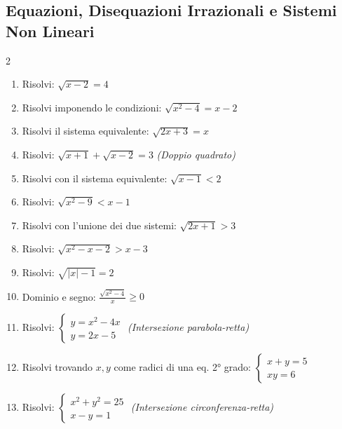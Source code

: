 \subsection{Equazioni, Disequazioni Irrazionali e Sistemi Non Lineari}
\begin{multicols}{2}
\begin{enumerate}
    \item {} Risolvi: $\sqrt{x-2} = 4$
    \item {} Risolvi imponendo le condizioni: $\sqrt{x^2 - 4} = x - 2$
    \item {} Risolvi il sistema equivalente: $\sqrt{2x+3} = x$
    \item {} Risolvi: $\sqrt{x+1} + \sqrt{x-2} = 3$ \textit{(Doppio quadrato)}
    \item {} Risolvi con il sistema equivalente: $\sqrt{x-1} < 2$
    \item {} Risolvi: $\sqrt{x^2 - 9} < x - 1$
    \item {} Risolvi con l'unione dei due sistemi: $\sqrt{2x+1} > 3$
    \item {} Risolvi: $\sqrt{x^2 - x - 2} > x - 3$
    \item {} Risolvi: $\sqrt{|x| - 1} = 2$
    \item {} Dominio e segno: $\frac{\sqrt{x^2-4}}{x} \ge 0$
    \item {} Risolvi: $\begin{cases} y = x^2 - 4x \\ y = 2x - 5 \end{cases}$ \textit{(Intersezione parabola-retta)}
    \item {} Risolvi trovando $x,y$ come radici di una eq. 2° grado: $\begin{cases} x+y=5 \\ xy=6 \end{cases}$
    \item {} Risolvi: $\begin{cases} x^2 + y^2 = 25 \\ x - y = 1 \end{cases}$ \textit{(Intersezione circonferenza-retta)}
\end{enumerate}
\end{multicols}